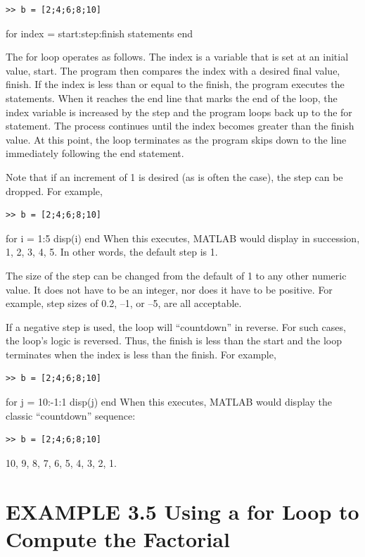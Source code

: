 \documentclass[../main.tex]{subfiles}
\begin{document}
\begin{lstlisting}[frame=none, numbers=none]
    >> b = [2;4;6;8;10]
\end{lstlisting}for index = start:step:finish
statements
end


The for loop operates as follows. The index is a variable that is set at an initial value,
start. The program then compares the index with a desired final value, finish. If the
index is less than or equal to the finish, the program executes the statements. When
it reaches the end line that marks the end of the loop, the index variable is increased by
the step and the program loops back up to the for statement. The process continues until
the index becomes greater than the finish value. At this point, the loop terminates as the
program skips down to the line immediately following the end statement.


Note that if an increment of 1 is desired (as is often the case), the step can be dropped.
For example,


\begin{lstlisting}[frame=none, numbers=none]
    >> b = [2;4;6;8;10]
\end{lstlisting}for i = 1:5
disp(i)
end
When this executes, MATLAB would display in succession, 1, 2, 3, 4, 5. In other
words, the default step is 1.


The size of the step can be changed from the default of 1 to any other numeric value.
It does not have to be an integer, nor does it have to be positive. For example, step sizes of
0.2, –1, or –5, are all acceptable.


If a negative step is used, the loop will “countdown” in reverse. For such cases, the
loop’s logic is reversed. Thus, the finish is less than the start and the loop terminates
when the index is less than the finish. For example,
\begin{lstlisting}[frame=none, numbers=none]
    >> b = [2;4;6;8;10]
\end{lstlisting}for j = 10:-1:1
disp(j)
end
When this executes, MATLAB would display the classic “countdown” sequence: 
\begin{lstlisting}[frame=none, numbers=none]
    >> b = [2;4;6;8;10]
\end{lstlisting}10, 9,
8, 7, 6, 5, 4, 3, 2, 1.


\section*{EXAMPLE 3.5 Using a for Loop to Compute the Factorial}
\end{document}
